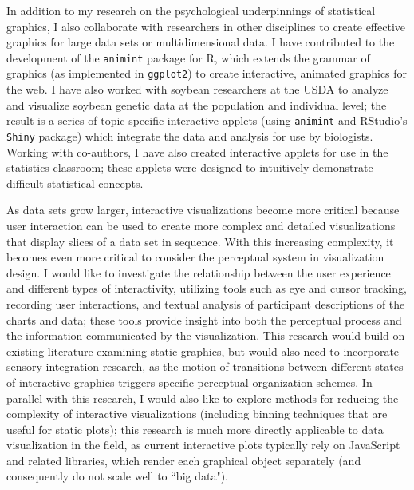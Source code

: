 \documentclass[11pt,letterpaper,sans,unicode]{moderncv}        %
\begin{document}
\vspace{.65cm}\hspace{8pt}In addition to my research on the psychological underpinnings of statistical graphics, I also collaborate with researchers in other disciplines to create effective graphics for large data sets or multidimensional data. I have contributed to the development of the \texttt{animint} package for R, which extends the grammar of graphics (as implemented in \texttt{ggplot2}) to create interactive, animated graphics for the web. I have also worked with soybean researchers at the USDA to analyze and visualize soybean genetic data at the population and individual level; the result is a series of topic-specific interactive applets (using \texttt{animint} and RStudio's \texttt{Shiny} package) which integrate the data and analysis for use by biologists. Working with co-authors, I have also created interactive applets for use in the statistics classroom; these applets were designed to intuitively demonstrate difficult statistical concepts. 


\vspace{.65cm}\hspace{8pt} As data sets grow larger, interactive visualizations become more critical because user interaction can be used to create more complex and detailed visualizations that display slices of a data set in sequence. With this increasing complexity, it becomes even more critical to consider the perceptual system in visualization design. I would like to investigate the relationship between the user experience and different types of interactivity, utilizing tools such as eye and cursor tracking, recording user interactions, and textual analysis of participant descriptions of the charts and data; these tools provide insight into both the perceptual process and the information communicated by the visualization. This research would build on existing literature examining static graphics, but would also need to incorporate sensory integration research, as the motion of transitions between different states of interactive graphics triggers specific perceptual organization schemes. In parallel with this research, I would also like to explore methods for reducing the complexity of interactive visualizations (including binning techniques that are useful for static plots); this research is much more directly applicable to data visualization in the field, as current interactive plots typically rely on JavaScript and related libraries, which render each graphical object separately (and consequently do not scale well to ``big data"). 
\end{document}
